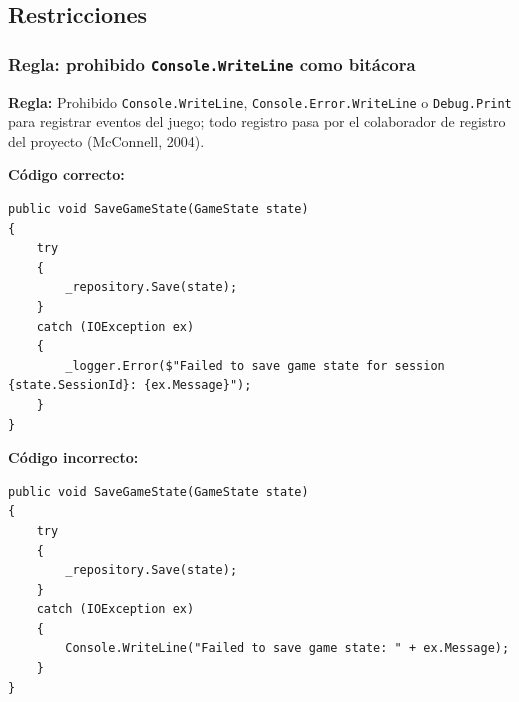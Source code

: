 \subsection{Restricciones}

\subsubsection{Regla: prohibido \texttt{Console.WriteLine} como bitácora}

\textbf{Regla:} Prohibido \texttt{Console.WriteLine}, \texttt{Console.Error.WriteLine} o \texttt{Debug.Print} para registrar eventos del juego; todo registro pasa por el colaborador de registro del proyecto (McConnell, 2004).

\textbf{Código correcto:}
\begin{lstlisting}[style=csharpstyle]
public void SaveGameState(GameState state)
{
    try
    {
        _repository.Save(state);
    }
    catch (IOException ex)
    {
        _logger.Error($"Failed to save game state for session {state.SessionId}: {ex.Message}");
    }
}
\end{lstlisting}

\textbf{Código incorrecto:}
\begin{lstlisting}[style=csharpstyle]
public void SaveGameState(GameState state)
{
    try
    {
        _repository.Save(state);
    }
    catch (IOException ex)
    {
        Console.WriteLine("Failed to save game state: " + ex.Message);
    }
}
\end{lstlisting}
